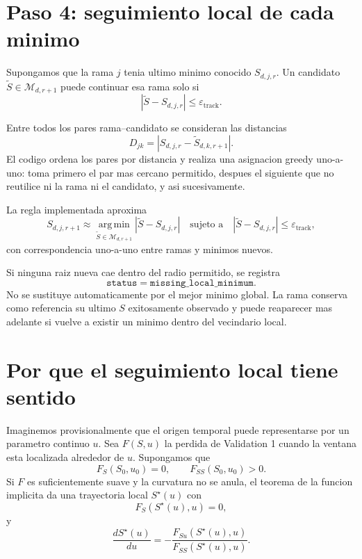 \documentclass[11pt]{article}
\newcommand{\argmin}{\operatorname*{arg\,min}}
\begin{document}
\section{Paso 4: seguimiento local de cada minimo}

Supongamos que la rama \(j\) tenia ultimo minimo conocido \(S_{d,j,r}\). Un
candidato \(\widetilde S\in\mathcal{M}_{d,r+1}\) puede continuar esa rama solo
si
\begin{equation}
|\widetilde S-S_{d,j,r}|
\le
\varepsilon_{\mathrm{track}}.
\label{eq:track}
\end{equation}

Entre todos los pares rama--candidato se consideran las distancias
\[
D_{jk}
=
|S_{d,j,r}-\widetilde S_{d,k,r+1}|.
\]
El codigo ordena los pares por distancia y realiza una asignacion greedy
uno-a-uno: toma primero el par mas cercano permitido, despues el siguiente que
no reutilice ni la rama ni el candidato, y asi sucesivamente.

La regla implementada aproxima
\begin{equation}
S_{d,j,r+1}
\approx
\argmin_{\widetilde S\in\mathcal{M}_{d,r+1}}
|\widetilde S-S_{d,j,r}|
\quad
\text{sujeto a}
\quad
|\widetilde S-S_{d,j,r}|
\le
\varepsilon_{\mathrm{track}},
\label{eq:continuation-rule}
\end{equation}
con correspondencia uno-a-uno entre ramas y minimos nuevos.

Si ninguna raiz nueva cae dentro del radio permitido, se registra
\[
\texttt{status}=\texttt{missing\_local\_minimum}.
\]
No se sustituye automaticamente por el mejor minimo global. La rama conserva
como referencia su ultimo \(S\) exitosamente observado y puede reaparecer mas
adelante si vuelve a existir un minimo dentro del vecindario local.

\section{Por que el seguimiento local tiene sentido}

Imaginemos provisionalmente que el origen temporal puede representarse por un
parametro continuo \(u\). Sea \(F(S,u)\) la perdida de Validation 1 cuando la
ventana esta localizada alrededor de \(u\). Supongamos que
\[
F_S(S_0,u_0)=0,
\qquad
F_{SS}(S_0,u_0)>0.
\]
Si \(F\) es suficientemente suave y la curvatura no se anula, el teorema de la
funcion implicita da una trayectoria local \(S^\star(u)\) con
\[
F_S(S^\star(u),u)=0,
\]
y
\begin{equation}
\frac{dS^\star(u)}{du}
=
-
\frac{F_{Su}(S^\star(u),u)}
{F_{SS}(S^\star(u),u)}.
\label{eq:implicit}
\end{equation}
\end{document}
